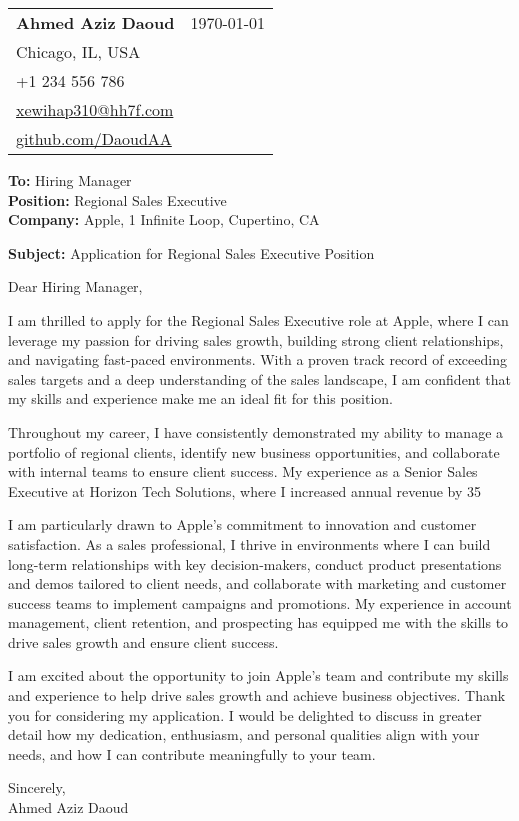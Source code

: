 \documentclass[letterpaper,11pt]{article}
\makeatletter
\newcommand{\letterHeading}[5]{
    \begin{tabular*}{\textwidth}{l@{\extracolsep{\fill}}r}
    \textbf{\Large #1} & #5 \\  %
    #2 & \\
    #3 & \\
    #4 & \\
    \end{tabular*}
    \vspace{15pt}
}
\newcommand{\letterRecipient}[3]{
    \textbf{\large To:} #1 \\
    \textbf{\large Position:} #2 \\
    \textbf{\large Company:} #3 \\
    \vspace{12pt}
}
\newcommand{\letterSubject}[1]{
    \textbf{\large Subject:} #1 \\
    \vspace{15pt}
}
\makeatother
\begin{document}
    \letterHeading
    {Ahmed Aziz Daoud}
    {Chicago, IL, USA}
    {+1 234 556 786 \\ \href{mailto:xewihap310@hh7f.com}{xewihap310@hh7f.com}}
    {\href{https://github.com/DaoudAA}{github.com/DaoudAA}}
    {\today}

    \letterRecipient
    {Hiring Manager}
    {Regional Sales Executive}
    {Apple, 1 Infinite Loop, Cupertino, CA}

    \letterSubject{Application for Regional Sales Executive Position}

    Dear Hiring Manager,

    I am thrilled to apply for the Regional Sales Executive role at Apple, where I can leverage my passion for driving sales growth, building strong client relationships, and navigating fast-paced environments. With a proven track record of exceeding sales targets and a deep understanding of the sales landscape, I am confident that my skills and experience make me an ideal fit for this position.

    Throughout my career, I have consistently demonstrated my ability to manage a portfolio of regional clients, identify new business opportunities, and collaborate with internal teams to ensure client success. My experience as a Senior Sales Executive at Horizon Tech Solutions, where I increased annual revenue by 35%

    I am particularly drawn to Apple's commitment to innovation and customer satisfaction. As a sales professional, I thrive in environments where I can build long-term relationships with key decision-makers, conduct product presentations and demos tailored to client needs, and collaborate with marketing and customer success teams to implement campaigns and promotions. My experience in account management, client retention, and prospecting has equipped me with the skills to drive sales growth and ensure client success.

    I am excited about the opportunity to join Apple's team and contribute my skills and experience to help drive sales growth and achieve business objectives. Thank you for considering my application. I would be delighted to discuss in greater detail how my dedication, enthusiasm, and personal qualities align with your needs, and how I can contribute meaningfully to your team.

    Sincerely,\\[12pt]

    Ahmed Aziz Daoud
\end{document}
